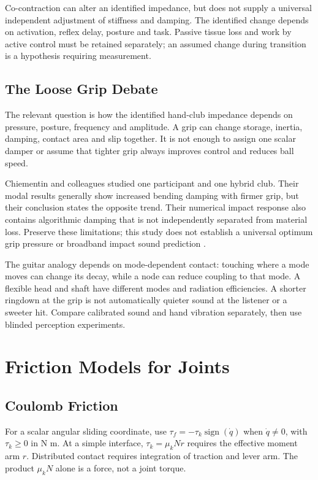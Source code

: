 Co-contraction can alter an identified impedance, but does not supply a universal independent adjustment of stiffness and damping. The identified change depends on activation, reflex delay, posture and task. Passive tissue loss and work by active control must be retained separately; an assumed change during transition is a hypothesis requiring measurement.

\subsection{The Loose Grip Debate}\label{the-loose-grip-debate}

The relevant question is how the identified hand-club impedance depends on pressure, posture, frequency and amplitude. A grip can change storage, inertia, damping, contact area and slip together. It is not enough to assign one scalar damper or assume that tighter grip always improves control and reduces ball speed.

Chiementin and colleagues studied one participant and one hybrid club. Their modal results generally show increased bending damping with firmer grip, but their conclusion states the opposite trend. Their numerical impact response also contains algorithmic damping that is not independently separated from material loss. Preserve these limitations; this study does not establish a universal optimum grip pressure or broadband impact sound prediction \citep{chiementin2019grip}.

The guitar analogy depends on mode-dependent contact: touching where a mode moves can change its decay, while a node can reduce coupling to that mode. A flexible head and shaft have different modes and radiation efficiencies. A shorter ringdown at the grip is not automatically quieter sound at the listener or a sweeter hit. Compare calibrated sound and hand vibration separately, then use blinded perception experiments.

\section{Friction Models for Joints}\label{sec:friction_models}\label{friction-models-for-joints}

\subsection{Coulomb Friction}\label{coulomb-friction}

For a scalar angular sliding coordinate, use \(\tau_f=-\tau_k\operatorname{sign}(\dot q)\) when \(\dot q\ne0\), with \(\tau_k\geq0\) in N m. At a simple interface, \(\tau_k=\mu_k N r\) requires the effective moment arm \(r\). Distributed contact requires integration of traction and lever arm. The product \(\mu_k N\) alone is a force, not a joint torque.

